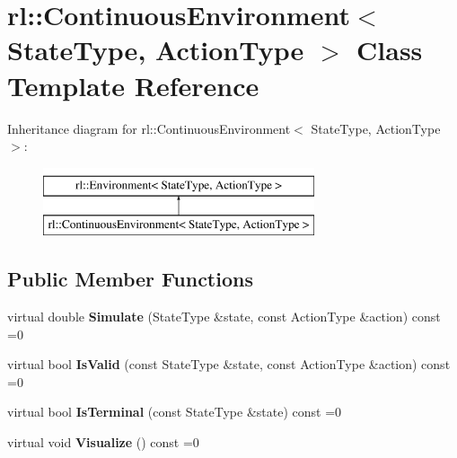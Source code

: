 \hypertarget{classrl_1_1_continuous_environment}{}\section{rl\+:\+:Continuous\+Environment$<$ State\+Type, Action\+Type $>$ Class Template Reference}
\label{classrl_1_1_continuous_environment}
Inheritance diagram for rl\+:\+:Continuous\+Environment$<$ State\+Type, Action\+Type $>$\+:\begin{figure}[H]
\begin{center}
\leavevmode
\includegraphics[height=2.000000cm]{classrl_1_1_continuous_environment}
\end{center}
\end{figure}
\subsection*{Public Member Functions}
\begin{DoxyCompactItemize}
\item 
\hypertarget{classrl_1_1_continuous_environment_af0e392fa4386844af51ab37240f8b571}{}\label{classrl_1_1_continuous_environment_af0e392fa4386844af51ab37240f8b571} 
virtual double {\bfseries Simulate} (State\+Type \&state, const Action\+Type \&action) const =0
\item 
\hypertarget{classrl_1_1_continuous_environment_a466838c85ee23ed7d7419a405a441c3f}{}\label{classrl_1_1_continuous_environment_a466838c85ee23ed7d7419a405a441c3f} 
virtual bool {\bfseries Is\+Valid} (const State\+Type \&state, const Action\+Type \&action) const =0
\item 
\hypertarget{classrl_1_1_continuous_environment_a0d77aca7121b4580d2705db32b5554e6}{}\label{classrl_1_1_continuous_environment_a0d77aca7121b4580d2705db32b5554e6} 
virtual bool {\bfseries Is\+Terminal} (const State\+Type \&state) const =0
\item 
\hypertarget{classrl_1_1_continuous_environment_a06e933c1d442280b57e39e59ec72fd94}{}\label{classrl_1_1_continuous_environment_a06e933c1d442280b57e39e59ec72fd94} 
virtual void {\bfseries Visualize} () const =0
\end{DoxyCompactItemize}


